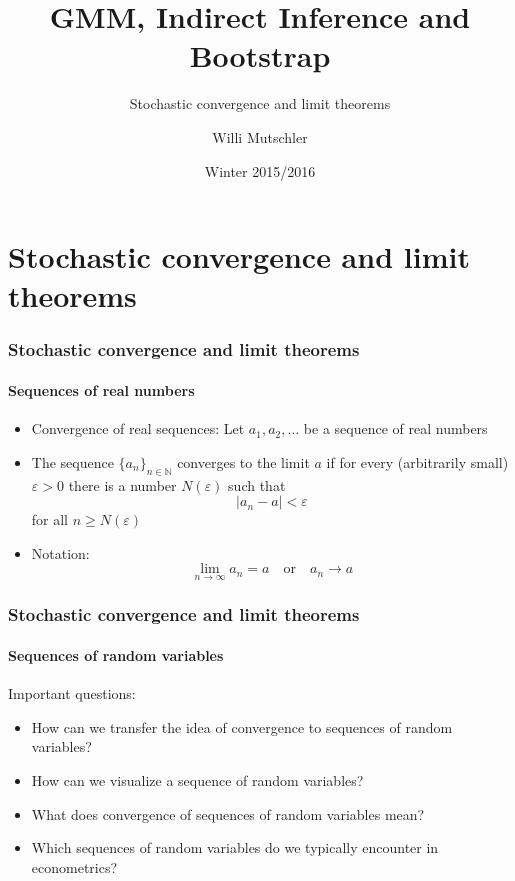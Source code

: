 \documentclass[notes=show]{beamer}
\begin{document}
\title{GMM, Indirect Inference and Bootstrap}
\subtitle{Stochastic convergence and limit theorems}
\author[Willi Mutschler]{Willi Mutschler}
\date{Winter 2015/2016}
\maketitle
\section{Stochastic convergence and limit theorems}

\begin{frame}\frametitle{Stochastic convergence and limit theorems}\framesubtitle{Sequences of real numbers}
\begin{itemize}
    \item Convergence of real sequences: Let $a_{1},a_{2},\ldots $ be a sequence of real numbers
    \item The sequence $\{a_{n}\}_{n\in \mathbb{N}}$ converges to the limit $a$ if for every (arbitrarily small) $\varepsilon >0$ there is a number $ N(\varepsilon )$ such that
        \begin{equation*}
            |a_{n}-a|<\varepsilon
        \end{equation*}
        for all $n\geq N(\varepsilon )$
    \item Notation: $\quad $
        \begin{equation*}
            \lim_{n\rightarrow \infty }a_{n}=a\quad \text{or}\quad a_{n}\rightarrow a
        \end{equation*}
\end{itemize}
\end{frame}


\begin{frame}\frametitle{Stochastic convergence and limit theorems}\framesubtitle{Sequences of random variables}
Important questions:
\begin{itemize}
    \item How can we transfer the idea of convergence to sequences of random variables?
    \item How can we visualize a sequence of random variables?
    \item What does convergence of sequences of random variables mean?
    \item Which sequences of random variables do we typically encounter in econometrics?
\end{itemize}
\end{frame}
\end{document}
